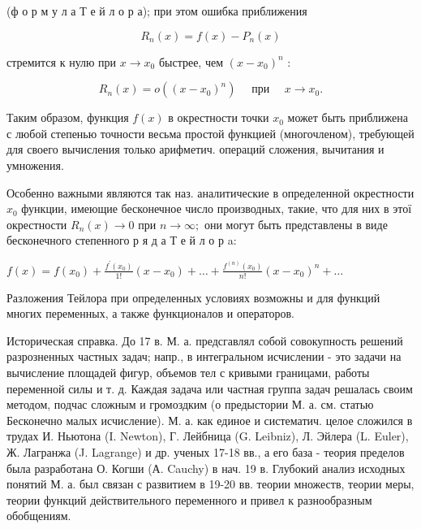 \documentclass[10pt]{article}
\begin{document}
(ф о р м у л а Т е й л о р а); при этом ошибка приближения



\[

R_{n}(x)=f(x)-P_{n}(x)

\]



стремится к нулю при $x \rightarrow x_{0}$ быстрее, чем $\left(x-x_{0}\right)^{n}$ :



\[

R_{n}(x)=o\left(\left(x-x_{0}\right)^{n}\right) \quad \text { при } \quad x \longrightarrow x_{0} .

\]



Таким образом, функция $f(x)$ в окрестности точки $x_{0}$ может быть приближена с любой степенью точности весьма простой функцией (многочленом), требующей для своего вычисления только арифметич. операций сложения, вычитания и умножения.



Особенно важными являются так наз. аналитические в определенной окрестности $x_{0}$ функции, имеющие бесконечное число производных, такие, что для них в этої окрестности $R_{n}(x) \rightarrow 0$ при $n \rightarrow \infty ;$ они могут быть представлены в виде бесконечного степенного р я д а Т е й л о р a:



$f(x)=f\left(x_{0}\right)+\frac{f^{\prime}\left(x_{0}\right)}{1 !}\left(x-x_{0}\right)+\ldots+\frac{f^{(n)}\left(x_{0}\right)}{n !}\left(x-x_{0}\right)^{n}+\ldots$



Разложения Тейлора при определенных условиях возможны и для функций многих переменных, а также функционалов и операторов.



Историческая справка. До 17 в. М. а. предсгавлял собой совокупность решений разрозненных частных задач; напр., в интегральном исчислении - это задачи на вычисление площадей фигур, объемов тел с кривыми границами, работы переменной силы и т. д. Каждая задача или частная группа задач решалась своим методом, подчас сложным и громоздким (о предыстории М. а. см. статью Бесконечно малых исчисление). М. а. как единое и систематич. целое сложился в трудах И. Ньютона (I. Newton), Г. Лейбница (G. Leibniz), Л. Эйлера (L. Euler), Ж. Лагранжа (J. Lagrange) и др. ученых 17-18 вв., а его база - теория пределов была разработана О. Когши (А. Cauchy) в нач. 19 в. Глубокий анализ исходных понятий М. а. был связан с развитием в 19-20 вв. теории множеств, теории меры, теории функций действительного переменного и привел к разнообразным обобщениям.
\end{document}
